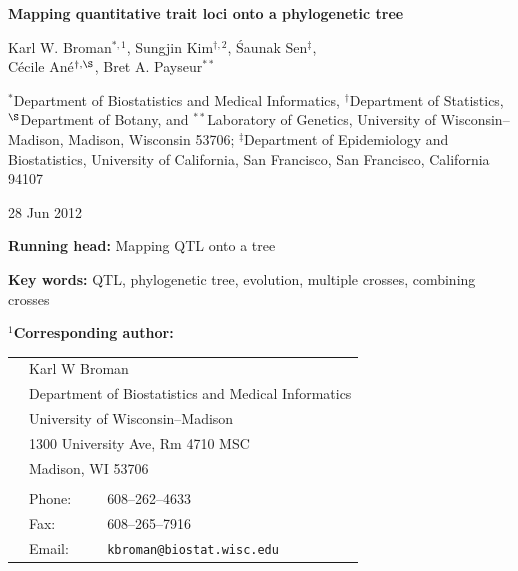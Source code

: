 \documentclass[12pt,letterpaper]{article}
\begin{document}

\vspace*{8mm}
\begin{center}

\textbf{\Large Mapping quantitative trait loci %
onto a phylogenetic tree}
 
 
\bigskip \bigskip \bigskip \bigskip 
 
{\large Karl W. Broman$^{*,1}$, Sungjin Kim$^{\dagger,2}$, \'Saunak
  Sen$^\ddagger$,\\ 
C\'ecile An\'e$^{\dagger,\S}$, Bret A. Payseur$^{**}$}

\bigskip \bigskip

$^*$Department of Biostatistics and Medical Informatics,
$^\dagger$Department of Statistics, $^{\S}$Department of Botany, and $^{**}$Laboratory of
Genetics, University of Wisconsin--Madison, Madison, Wisconsin
53706; $^\ddagger$Department of Epidemiology and Biostatistics, University
of California, San Francisco, San Francisco, California 94107
\end{center}


\vfill

\hfill 
{\footnotesize 28 Jun 2012}

\newpage

\noindent \textbf{Running head:} Mapping QTL onto a tree


\bigskip \bigskip \bigskip

\noindent \textbf{Key words:} QTL, phylogenetic tree, evolution,
multiple crosses, combining crosses



\bigskip \bigskip \bigskip

\noindent \textbf{$^1$Corresponding author:}

\begin{tabular}{lll}
 \\
 \hspace{1cm} & \multicolumn{2}{l}{Karl W Broman} \\
 & \multicolumn{2}{l}{Department of Biostatistics and Medical Informatics} \\
 & \multicolumn{2}{l}{University of Wisconsin--Madison} \\
 & \multicolumn{2}{l}{1300 University Ave, Rm 4710 MSC} \\
 & \multicolumn{2}{l}{Madison, WI 53706} \\
 \\
 & Phone: & 608--262--4633 \\
 & Fax: & 608--265--7916 \\
 & Email: & \verb|kbroman@biostat.wisc.edu|
\end{tabular}
\end{document}
